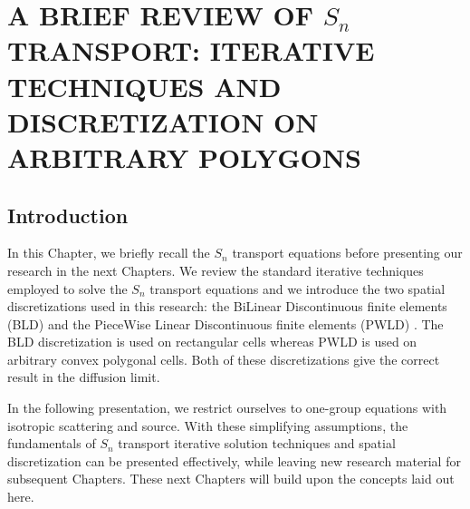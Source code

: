\chapter{\uppercase{A Brief Review of $S_n$ Transport: Iterative Techniques
and Discretization on Arbitrary Polygons}} \label{spatial_chapter}
\section{Introduction}                      
In this Chapter, we briefly recall the $S_n$ transport equations before presenting 
our research in the next Chapters. We review the standard iterative 
techniques employed to solve the $S_n$ transport equations and we introduce the 
two spatial discretizations used in this research: the BiLinear Discontinuous 
finite elements (BLD) \cite{thick_dgfem,lumping_bld} and the PieceWise Linear 
Discontinuous finite elements (PWLD) \cite{pwld_3d,pwld_2d}. The BLD 
discretization is used on rectangular cells whereas PWLD is used 
on arbitrary convex polygonal cells. Both of these discretizations give the 
correct result in the diffusion limit. 

In the following presentation, we restrict ourselves to one-group equations
with isotropic scattering and source. With these simplifying assumptions,
the fundamentals of $S_n$ transport iterative solution techniques and
spatial discretization can be presented effectively, while leaving new
research material for subsequent Chapters. These next Chapters will build
upon the concepts laid out here.
